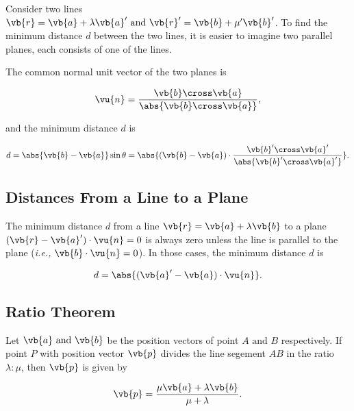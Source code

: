 \documentclass[a4paper,12pt]{report}
\begin{document}
Consider two lines \(\vb{r} = \vb{a} + \lambda \vb{a}' \text { and } \vb{r} ' = \vb{b} + \mu '\vb{b} '\). To find the minimum distance \(d\) between the two lines, it is easier to imagine two parallel planes, each consists of one of the lines.

The common normal unit vector of the two planes is 

\begin{equation}
    \vu{n} = \frac{\vb{b} \cross \vb{a} }{\abs{\vb{b} \cross \vb{a} } }, 
\end{equation}

and the minimum distance \(d\) is 

\begin{equation}
    d = \abs{\vb{b} - \vb{a} } \sin \theta = \abs{(\vb{b} - \vb{a} )\cdot \frac{\vb{b}' \cross \vb{a}' }{\abs{\vb{b}' \cross \vb{a}' } }} .
\end{equation}

\subsection{Distances From a Line to a Plane}

The minimum distance \(d\) from a line \(\vb{r} = \vb{a} + \lambda \vb{b} \) to a plane \((\vb{r} - \vb{a} ')\cdot \vu{n} = 0\) is always zero unless the line is parallel to the plane (\textit{i.e.,} \(\vb{b} \cdot \vu{n} = 0\)). In those cases, the minimum distance \(d\) is 

\begin{equation}
    d = \abs{(\vb{a} ' - \vb{a} ) \cdot \vu{n} }. 
\end{equation}

\subsection{Ratio Theorem}

Let \(\vb{a} \text { and } \vb{b} \) be the position vectors of point \(A \text { and } B\) respectively. If point \(P\) with position vector \(\vb{p} \) divides the line segement \(AB\) in the ratio \(\lambda : \mu \), then \(\vb{p} \) is given by 

\begin{equation}
    \vb{p} = \frac{\mu \vb{a} + \lambda \vb{b} }{\mu + \lambda }. 
\end{equation}
\end{document}
